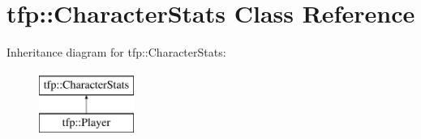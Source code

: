 \hypertarget{classtfp_1_1_character_stats}{}\section{tfp\+:\+:Character\+Stats Class Reference}
\label{classtfp_1_1_character_stats}
Inheritance diagram for tfp\+:\+:Character\+Stats\+:\begin{figure}[H]
\begin{center}
\leavevmode
\includegraphics[height=2.000000cm]{classtfp_1_1_character_stats}
\end{center}
\end{figure}
